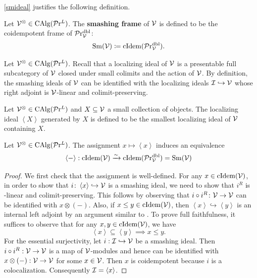 \documentclass[10pt,a4paper,oneside]{article}
\begin{document}
\begin{rem}
\cref{smideal} justifies the following definition.
\end{rem}

\begin{de}
Let $\mathcal{V}^\otimes\in\operatorname{CAlg}(\mathcal{P}\mathrm{r}^L)$. The \textbf{smashing frame} of $\mathcal{V}$ is defined to be the coidempotent frame of $\mathcal{P}\mathrm{r}_{\mathcal{V}}^{\operatorname{dbl}}$:
\[
\operatorname{Sm}(\mathcal{V})\coloneqq\operatorname{cIdem}(\mathcal{P}\mathrm{r}_{\mathcal{V}}^{\operatorname{dbl}}).
\]
\end{de}

\begin{rem}
Let $\mathcal{V}^\otimes\in \operatorname{CAlg}(\mathcal{P}\mathrm{r}^L)$. Recall that a localizing ideal of $\mathcal{V}$ is a presentable full subcategory of $\mathcal{V}$ closed under small colimits and the action of $\mathcal{V}$. By definition, the smashing ideals of $\mathcal{V}$ can be identified with the localizing ideals $\mathcal{I} \hookrightarrow \mathcal{V}$ whose right adjoint is $\mathcal{V}$-linear and colimit-preserving.
\end{rem}

\begin{de}
Let $\mathcal{V}^\otimes\in \operatorname{CAlg}(\mathcal{P}\mathrm{r}^L)$ and $X\subseteq\mathcal{V}$ a small collection of objects. The localizing ideal $\left<X \right>$ generated by $X$ is defined to be the smallest localizing ideal of $\mathcal{V}$ containing $X$.
\end{de}

\begin{thm}\label{smidsmcoloc}
Let $\mathcal{V}^\otimes\in \operatorname{CAlg}(\mathcal{P}\mathrm{r}^L)$. The assignment $x\mapsto \left<x \right>$ induces an equivalence
$$\left<- \right>: \operatorname{cIdem}(\mathcal{V})\xrightarrow{\sim} \operatorname{cIdem}(\mathcal{P}\mathrm{r}_{\mathcal{V}}^{\operatorname{dbl}}) = \operatorname{Sm}(\mathcal{V})$$
\end{thm}
\begin{proof}
We first check that the assignment is well-defined. For any $x\in\operatorname{cIdem}(\mathcal{V})$, in order to show that $i\colon \left<x \right>\hookrightarrow\mathcal{V}$ is a smashing ideal, we need to show that $i^R$ is \mcv-linear and colimit-preserving. This follows by observing that $i\circ i^R\colon\mathcal{V}\to \mathcal{V}$ can be identified with $x\otimes (-)$. Also, if $x\leq y \in\operatorname{cIdem}(\mathcal{V})$, then $\left<x \right>\hookrightarrow\left<y \right>$ is an internal left adjoint by an argument similar to \cite[Lemma 2.61]{ramzi2024dualizable}. To prove full faithfulness, it suffices to observe that for any $x,y\in\operatorname{cIdem}(\mathcal{V})$, we have $$\left<x \right>\subseteq\left<y \right> \implies x\leq y.$$
For the essential surjectivity, let $i:\mathcal{I}\hookrightarrow\mathcal{V}$ be a smashing ideal. Then  $i\circ i^R:\mathcal{V}\to \mathcal{V}$ is a map of $\mathcal{V}$-modules and hence can be identified with $x\otimes (-):\mathcal{V}\to \mathcal{V}$ for some $x\in\mathcal{V}$.
Then $x$ is coidempotent because $i$ is a colocalization. Consequently $\mathcal{I}=\left<x \right>$.
\end{proof}
\end{document}

